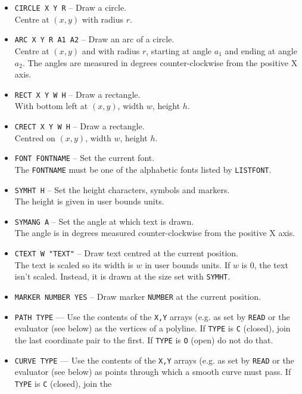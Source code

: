\documentclass[a4paper,twoside,11pt]{article}
\newcommand{\textttc}[1]{\texttt{\textcolor{OurRed}{#1}}}
\begin{document}
\begin{itemize}
\item \textttc{CIRCLE X Y R} -- Draw a circle.\\
  Centre at $(x,y)$ with radius $r$.
\item \textttc{ARC X Y R A1 A2} -- Draw an arc of a circle.\\
  Centre at $(x,y)$ and with radius $r$, starting at angle
  $a_1$ and ending at angle $a_2$. The angles are measured in degrees counter-clockwise from the positive X axis.
\item \textttc{RECT X Y W H} -- Draw a rectangle.\\
  With bottom left at $(x,y)$, width $w$, height $h$.
\item \textttc{CRECT X Y W H} -- Draw a rectangle.\\
  Centred on  $(x,y)$, width $w$, height $h$.
\item \textttc{FONT FONTNAME} -- Set the current font.\\
  The \texttt{FONTNAME} must be one of the alphabetic fonts listed by \texttt{LISTFONT}.
\item \textttc{SYMHT H} -- Set the height characters, symbols and markers.\\
  The height is given in user bounds units.
\item \textttc{SYMANG A} -- Set the angle at which text is drawn.\\
  The angle is in degrees measured counter-clockwise from the positive X axis.
\item \textttc{CTEXT W "TEXT"} -- Draw text centred at the current position.\\
  The text is scaled so its width is $w$ in user bounds units. If $w$ is 0, the text isn't scaled.
  Instead, it is drawn at the size set with \texttt{SYMHT}.
\item \textttc{MARKER NUMBER YES} -- Draw marker \texttt{NUMBER} at the current position.
\item \textttc{PATH TYPE} --- Use the contents of the \texttt{X,Y} arrays (e.g. as set by \texttt{READ} or the
  evaluator (see below) as the vertices of a polyline. If \texttt{TYPE} is \texttt{C} (closed), join the
  last coordinate pair to the first. If \texttt{TYPE} is \texttt{O} (open) do not do that.
\item \textttc{CURVE TYPE} --- Use the contents of the \texttt{X,Y} arrays (e.g. as set by \texttt{READ} or the
  evaluator (see below) as points through which a smooth curve must pass. If \texttt{TYPE} is \texttt{C} (closed), join the

\end{itemize}
\end{document}

